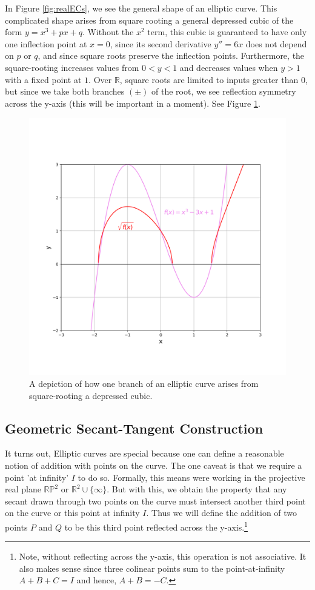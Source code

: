 \documentclass[11pt, a4paper]{report}
\newcommand{\reals}{\mathbb{R}}
\begin{document}
In Figure \ref{fig:realECs}, we see the general shape of an elliptic curve. This complicated shape arises from square rooting a general depressed cubic of the form $y=x^3+px+q$. Without the $x^2$ term, this cubic is guaranteed to have only one inflection point at $x=0$, since its second derivative $y'' = 6x$ does not depend on $p$ or $q$, and since square roots preserve the inflection points.
Furthermore, the square-rooting increases values from $0<y<1$ and decreases values when $y>1$ with a fixed point at $1$. Over $\reals$, square roots are limited to inputs greater than $0$, but since we take both branches $(\pm)$ of the root, we see reflection symmetry across the y-axis (this will be important in a moment).\autocite{haese} See Figure \ref{fig:cubicsqrt}.
\begin{figure}[ht]
\begin{center}
\includegraphics[width=.8\linewidth]{cubic_function.png} 
\caption{A depiction of how one branch of an elliptic curve arises from square-rooting a depressed cubic.}
\label{fig:cubicsqrt}
\end{center}
\end{figure}

\subsection{Geometric Secant-Tangent Construction}

It turns out, Elliptic curves are special because one can define a reasonable notion of addition with points on the curve. The one caveat is that we require a point 'at infinity' $I$ to do so. Formally, this means were working in the projective real plane $\mathbb{RP}^2$ or $\mathbb{R}^2 \cup \lbrace \infty \rbrace$. 
But with this, we obtain the property that any secant drawn through two points on the curve must intersect another third point on the curve or this point at infinity $I$. Thus we will define the addition of two points $P$ and $Q$ to be this third point reflected across the y-axis.\footnote{Note, without reflecting across the y-axis, this operation is not associative. It also makes sense since three colinear points sum to the point-at-infinity $A+B+C=I$ and hence, $A+B=-C$.}
\end{document}
